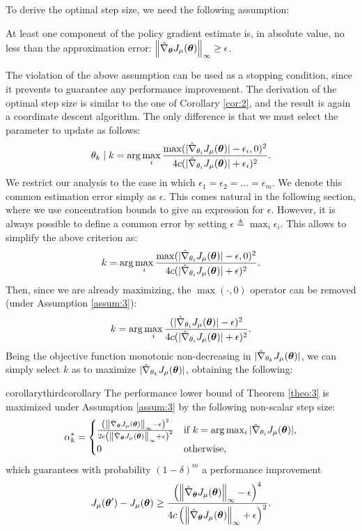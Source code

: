 To derive the optimal step size, we need the following assumption:

\begin{assumption}\label{assum:3}
At least one component of the policy gradient estimate is, in absolute value, no less than the approximation error: $\norm[\infty]{\gradApp{\vtheta}} \geq \epsilon$.
\end{assumption}

The violation of the above assumption can be used as a stopping condition, since it prevents to guarantee any performance improvement.
The derivation of the optimal step size is similar to the one of Corollary \ref{cor:2}, and the result is again a coordinate descent algorithm.
The only difference is that we must select the parameter to update as follows:
\[
\theta_k \mid k = \arg \max\limits_i
\frac{\max(|\gradApp{\theta_i}| - \epsilon_i,0)^2}{4c(|\gradApp{\theta_i}| + \epsilon_i)^2}.
\]
We restrict our analysis to the case in which $\epsilon_1=\epsilon_2=\dotsc=\epsilon_m$. We denote this common estimation error simply as $\epsilon$. This comes natural in the following section, where we use concentration bounds to give an expression for $\epsilon$. However, it is always possible to define a common error by setting $\epsilon \triangleq \max_i \epsilon_i$. This allows to simplify the above criterion as:
\[
k = \arg \max\limits_i 
\frac{\max(|\gradApp{\theta_i}| - \epsilon,0)^2}{4c(|\gradApp{\theta_i}| + \epsilon)^2}.
\]
Then, since we are already maximizing, the $\max (\cdot,0)$ operator can be removed (under Assumption \ref{assum:3}):
\[
k = \arg \max\limits_i 
\frac{(|\gradApp{\theta_i}| - \epsilon)^2}{4c(|\gradApp{\theta_i}| + \epsilon)^2}.
\]
Being the objective function monotonic non-decreasing in $|\gradApp{\theta_k}|$, we can simply select $k$ as to maximize $|\gradApp{\theta_k}|$, obtaining the following:

\begin{restatable}{corollary}{thirdcorollary} \label{cor:3}
The performance lower bound of Theorem \ref{theo:3} is maximized under Assumption \ref{assum:3} by the following non-scalar step size:
\[
\alpha_k^* = 
\begin{cases}
	\frac{
		\left(\norm[\infty]{\gradApp{\vtheta}} - \epsilon\right)^2}
		{2c
		\left(\norm[\infty]{\gradApp{\vtheta}} + \epsilon\right)^2} & 
		\text{if } k = \arg\max_i |\gradApp{\theta_i}|,	\\
		0 & \text{otherwise},
\end{cases}
\]
which guarantees with probability $(1-\delta)^m$ a performance improvement
\[
\DeltaJ \geq
\frac{
	\left(\norm[\infty]{\gradApp{\vtheta}} - \epsilon\right)^4}
	{4c
	\left(\norm[\infty]{\gradApp{\vtheta}} + \epsilon\right)^2}.
\]
\end{restatable}

